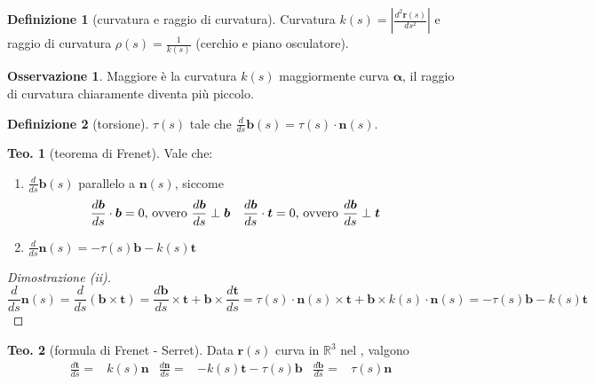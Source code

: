 \documentclass[a4paper,10pt]{article}
\theoremstyle{definition}
\newcommand{\bv}{\boldsymbol} %
\theoremstyle{indentdefinition}
\newtheorem{defn}{Definizione}[section]
\theoremstyle{indenttheorem}
\newtheorem{thm}{Teo.}
\theoremstyle{myremark}
\newtheorem*{rem*}{Osservazione}
\theoremstyle{indentgeneral}
\begin{document}
\begin{defn}[curvatura e raggio di curvatura]
\label{def:curvatura-raggio}Curvatura $k\left(s\right)=\left|\frac{d^{2}\boldsymbol{r}\left(s\right)}{ds^{2}}\right|$
e raggio di curvatura $\rho\left(s\right)=\frac{1}{k\left(s\right)}$
(cerchio e piano osculatore).
\end{defn}

\begin{rem*}
    Maggiore è la curvatura $k(s)$ maggiormente curva $\bv{\alpha}$, il raggio di curvatura chiaramente diventa più piccolo.
\end{rem*}

\begin{defn}[torsione]
\label{def:torsione}$\tau\left(s\right)$ tale che $\frac{d}{ds}\boldsymbol{b}\left(s\right)=\tau\left(s\right)\cdot\boldsymbol{n}\left(s\right)$.
\end{defn}

\begin{thm}[teorema di Frenet]
\label{thm:teorema-Frenet}Vale che:
\end{thm}

\begin{enumerate}
\item $\frac{d}{ds}\boldsymbol{b}\left(s\right)$ parallelo a $\boldsymbol{n}\left(s\right)$,
siccome
\begin{align*}
\frac{d\boldsymbol{b}}{ds}\cdot\boldsymbol{b} & =0\text{, ovvero \ensuremath{\frac{d\boldsymbol{b}}{ds}\perp\boldsymbol{b}}} & \frac{d\boldsymbol{b}}{ds}\cdot\boldsymbol{t} & =0\text{, ovvero \ensuremath{\frac{d\boldsymbol{b}}{ds}\perp\boldsymbol{t}}}
\end{align*}
\item $\frac{d}{ds}\boldsymbol{n}\left(s\right)=-\tau\left(s\right)\boldsymbol{b}-k\left(s\right)\boldsymbol{t}$
\end{enumerate}
\begin{proof}[Dimostrazione (ii)]
\[
\frac{d}{ds}\boldsymbol{n}\left(s\right)=\frac{d}{ds}\left(\boldsymbol{b}\times\boldsymbol{t}\right)=\frac{d\boldsymbol{b}}{ds}\times\boldsymbol{t}+\boldsymbol{b}\times\frac{d\boldsymbol{t}}{ds}=\tau\left(s\right)\cdot\boldsymbol{n}\left(s\right)\times\boldsymbol{t}+\boldsymbol{b}\times k\left(s\right)\cdot\boldsymbol{n}\left(s\right)=-\tau\left(s\right)\boldsymbol{b}-k\left(s\right)\boldsymbol{t}
\]
\end{proof}
\begin{thm}[formula di Frenet - Serret]
\label{thm:formula-Frenet-Serret}Data $\boldsymbol{r}\left(s\right)$
curva in $\mathbb{R}^{3}$ nel ,
valgono
\begin{align*}
\frac{d\boldsymbol{t}}{ds}= & k\left(s\right)\boldsymbol{n} & \frac{d\boldsymbol{n}}{ds}= & -k\left(s\right)\boldsymbol{t}-\tau\left(s\right)\boldsymbol{b} & \frac{d\boldsymbol{b}}{ds}= & \tau\left(s\right)\boldsymbol{n}
\end{align*}
\end{thm}
\end{document}
